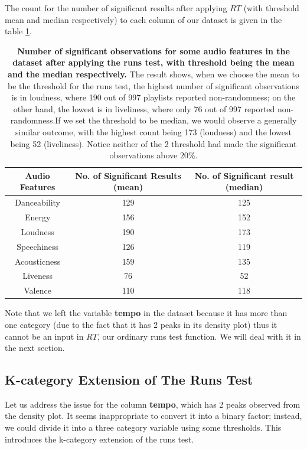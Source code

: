 \documentclass[12pt]{article}
\theoremstyle{plain}
\theoremstyle{definition}
\theoremstyle{remark}
\begin{document}
The count for the number of significant results after applying $RT$ (with threshold mean and median respectively) to each column of our dataset is given in the table \ref{table 1}.

\begin{table}[h!]
\begin{tabular}{|c|c|c|}
    \hline
     Audio Features & No. of Significant Results (mean) & No. of Significant result (median) \\
    \hline
     Danceability &129&125\\
     \hline
     Energy &156&152\\
     \hline
     Loudness &190&173\\
     \hline
     Speechiness &126&119\\
     \hline
     Acousticness &159&135\\
     \hline
     Liveness &76&52\\
     \hline
     Valence &110&118\\
    \hline
\end{tabular}
  \caption{\textbf{Number of significant observations for some audio features in the dataset after applying the runs test, with threshold being the mean and the median respectively.} The result shows, when we choose the mean to be the threshold for the runs test, the highest number of significant observations is in loudness, where 190 out of 997 playlists reported non-randomness; on the other hand, the lowest is in liveliness, where only 76 out of 997 reported non-randomness.If we set the threshold to be median, we would observe a generally similar outcome, with the highest count being 173 (loudness) and the lowest being 52 (liveliness). Notice neither of the 2 threshold had made the significant observations above $20\%$.}
  \label{table 1}
\end{table}
Note that we left the variable \textbf{tempo} in the dataset because it has more than one category (due to the fact that it has 2 peaks in its density plot) thus it cannot be an input in $RT$, our ordinary runs test function. We will deal with it in the next section.


\newpage
\subsection{K-category Extension of The Runs Test}
Let us address the issue for the column \textbf{tempo}, which has 2 peaks observed from the density plot. It seems inappropriate to convert it into a binary factor; instead, we could divide it into a three category variable using some thresholds. This introduces the k-category extension of the runs test\cite{3.4}\cite{3.3}.
\end{document}
